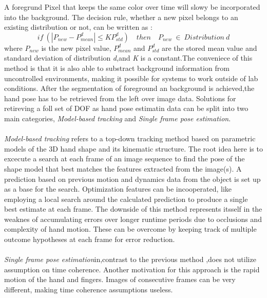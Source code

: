 A foregrund Pixel that keeps the same color over time will slowy be incorporated into the background.
The decision rule, whether a new pixel belongs to an existing distribution or not, can be written as \cite{Kristensen.Feb.2007}:
\begin{equation}
 if\ (|P_{new} −P^{d}_{mean}|\leq KP^{d}_{std})\quad then \quad P_{new}\  \in\ Distribution\ d
\end{equation}
where $P_{new}$ is the new pixel value, $P^{d}_{mean}$ and $P^{d}_{std}$ are the stored mean value and standard deviation of distribution \textit{d},and \textit{K} is a constant.The conveniece of this method is that it is also able to substract background information from uncontrolled environments, making it possible for systems to work outside of lab conditions.
After the segmentation of foreground an background is achieved,the hand pose has to be retrieved from the left over image data. Solutions for retireving a foll set of DOF as hand pose estimatin data can be split into two main categories\cite{Erol.2007}, \textit{Model-based tracking} and \textit{Single frame pose estimation}. \\\\
\textit{Model-based tracking} refers to a top-down tracking method based on parametric models of the 3D hand shape and its kinematic structure. The root idea here is to excecute a search at each frame of an image sequence to find the pose of the shape model that best matches the features extracted from the image(s). A prediction based on previous motion and dynamics data from the object is set up as a base for the search. Optimization features can be incooperated, like employing a local search around the calculated prediction to produce a single best estimate at each frame. The downside of this method represents itsself in the weaknes of accumulating errors over longer runtime periods due to occlusions and complexity of hand motion. These can be overcome by keeping track of multiple outcome hypotheses at each frame for error reduction.\\\\
\textit{Single frame pose estimation}in,contrast to the previous method ,does not utilize assumption on time coherence. Another motivation for this approach is the rapid motion of the hand and fingers. Images of consecutive frames can be very different, making time coherence assumptions useless.















